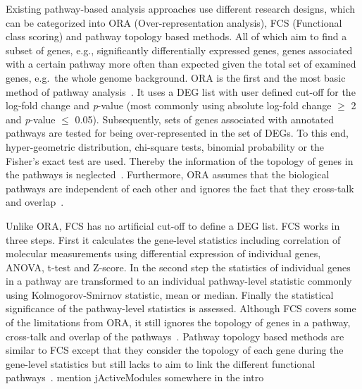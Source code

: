 \documentclass[10pt,a4paper,twocolumn]{article}
\newcommand{\FA}[1]{\begingroup\color{magenta}#1\endgroup}
\begin{document}
	
	Existing pathway-based analysis approaches use different research
	designs, which can be categorized into ORA (Over-representation
	analysis), FCS (Functional class scoring) and pathway topology based
	methods. All of which aim to find a subset of genes, e.g.,
	significantly differentially expressed genes, genes associated with a
	certain pathway more often than expected given the total set of
	examined genes, e.g.~the whole genome background. ORA is
	the first and the most basic method of pathway analysis~\cite{Campos}. It uses a
	DEG list with user defined cut-off for the log-fold change and
	\textit{p}-value (most commonly using absolute log-fold change $\geq$
	2 and \textit{p}-value $\leq$ 0.05). Subsequently, sets of genes
	associated with annotated pathways are tested for being
	over-represented in the set of DEGs. To this end, hyper-geometric
	distribution, chi-square tests, binomial probability or the Fisher’s
	exact test are used. Thereby the information of the topology of genes
	in the pathways is neglected~\cite{Bayer}. Furthermore, ORA assumes
	that the biological pathways are independent of each other and ignores
	the fact that they cross-talk and overlap~\cite{Khatri2012,Campos}.
	
	Unlike ORA, FCS has no artificial cut-off to define a DEG list. FCS works in
	three steps. First it calculates the gene-level statistics including
	correlation of molecular measurements using differential expression of
	individual genes, ANOVA, t-test and Z-score. In the second step the
	statistics of individual genes in a pathway are transformed to an
	individual pathway-level statistic commonly using Kolmogorov-Smirnov
	statistic, mean or median. Finally the statistical significance of the
	pathway-level statistics is assessed. Although FCS covers some of the
	limitations from ORA, it still ignores the topology of genes in a pathway,
	cross-talk and overlap of the pathways~\cite{Khatri2012,Campos}. Pathway
	topology based methods are similar to FCS except that they consider the
	topology of each gene during the gene-level statistics but still lacks to aim
	to link the different functional pathways~\cite{Khatri2012}. \FA{mention jActiveModules somewhere in the intro}
	
\end{document}

